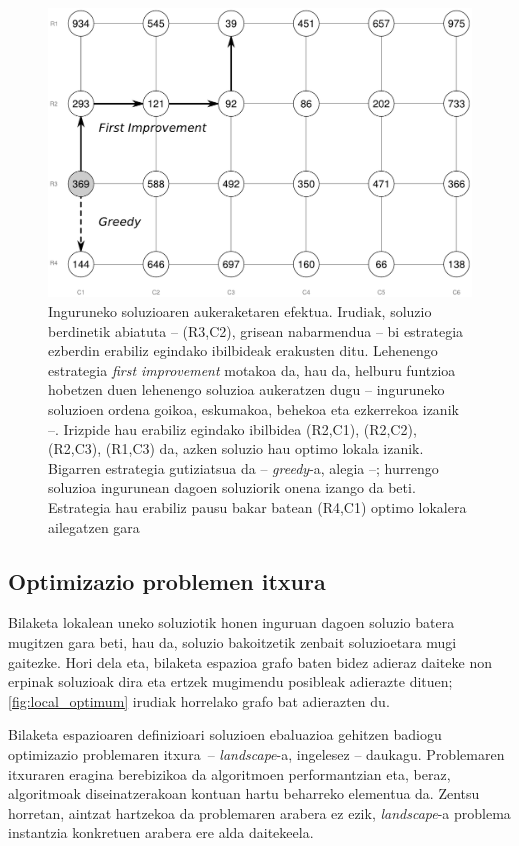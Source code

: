 \documentclass[eu]{ifirak}\usepackage[]{graphicx}\usepackage[]{color}
\newcommand{\zkk}{\guillemotleft}
\newcommand{\skk}{\guillemotright}
\begin{document}
\begin{figure}[t]
\centering
\includegraphics[width=0.66\linewidth]{./Irudiak/ls_selection_effect}
\caption{Inguruneko soluzioaren aukeraketaren efektua. Irudiak, soluzio berdinetik abiatuta -- (R3,C2), grisean nabarmendua -- bi estrategia ezberdin erabiliz egindako ibilbideak erakusten ditu. Lehenengo estrategia \textit{first improvement} motakoa da, hau da, helburu funtzioa hobetzen duen lehenengo soluzioa aukeratzen dugu -- inguruneko soluzioen ordena goikoa, eskumakoa, behekoa eta ezkerrekoa izanik --. Irizpide hau erabiliz egindako ibilbidea (R2,C1), (R2,C2), (R2,C3), (R1,C3) da, azken soluzio hau optimo lokala izanik. Bigarren estrategia gutiziatsua da -- \textit{greedy}-a, alegia --; hurrengo soluzioa ingurunean dagoen soluziorik onena izango da beti. Estrategia hau erabiliz pausu bakar batean (R4,C1) optimo lokalera ailegatzen gara}
\label{fig:ls_selection_effect}
\end{figure}



\subsection{Optimizazio problemen \zkk itxura\skk}

Bilaketa lokalean uneko soluziotik honen inguruan dagoen soluzio batera mugitzen gara beti, hau da, soluzio bakoitzetik zenbait soluzioetara mugi gaitezke. Hori dela eta, bilaketa espazioa grafo baten bidez adieraz daiteke non erpinak soluzioak dira eta ertzek mugimendu posibleak adierazte dituen; \ref{fig:local_optimum} irudiak horrelako grafo bat adierazten du.

Bilaketa espazioaren definizioari soluzioen ebaluazioa gehitzen badiogu optimizazio problemaren \zkk itxura\skk\ -- \textit{landscape}-a, ingelesez -- daukagu. Problemaren itxuraren eragina berebizikoa da algoritmoen performantzian eta, beraz, algoritmoak diseinatzerakoan kontuan hartu beharreko elementua da. Zentsu horretan, aintzat hartzekoa da problemaren arabera ez ezik, \textit{landscape}-a problema instantzia konkretuen arabera ere alda daitekeela.
\end{document}
